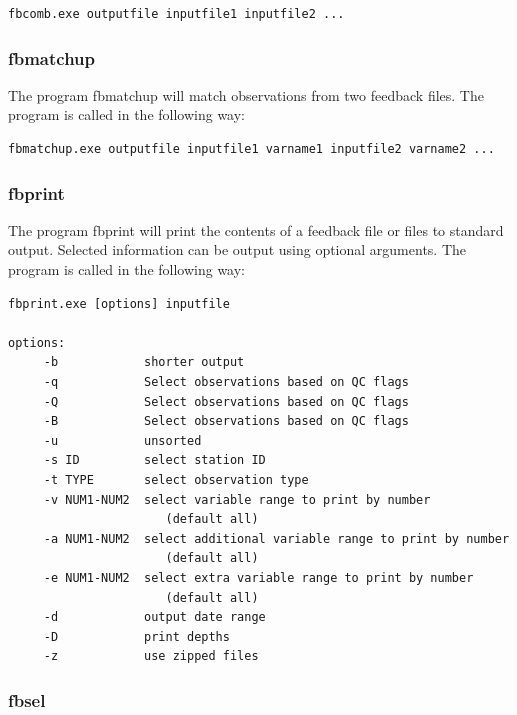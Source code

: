 \begin{alltt}
\footnotesize
\begin{verbatim}
fbcomb.exe outputfile inputfile1 inputfile2 ...
\end{verbatim}
\end{alltt}

\subsubsection{fbmatchup}

The program fbmatchup will match observations from two feedback files. The program is called
in the following way:

\begin{alltt}
\footnotesize
\begin{verbatim}
fbmatchup.exe outputfile inputfile1 varname1 inputfile2 varname2 ...
\end{verbatim}
\end{alltt}


\subsubsection{fbprint}

The program fbprint will print the contents of a feedback file or files to standard output.
Selected information can be output using optional arguments. The program is called in the
following way:

\begin{alltt}
\footnotesize
\begin{verbatim}
fbprint.exe [options] inputfile

options:
     -b            shorter output
     -q            Select observations based on QC flags
     -Q            Select observations based on QC flags
     -B            Select observations based on QC flags
     -u            unsorted
     -s ID         select station ID  
     -t TYPE       select observation type
     -v NUM1-NUM2  select variable range to print by number 
                      (default all)
     -a NUM1-NUM2  select additional variable range to print by number 
                      (default all)
     -e NUM1-NUM2  select extra variable range to print by number 
                      (default all)
     -d            output date range
     -D            print depths
     -z            use zipped files
\end{verbatim}
\end{alltt}

\subsubsection{fbsel}

